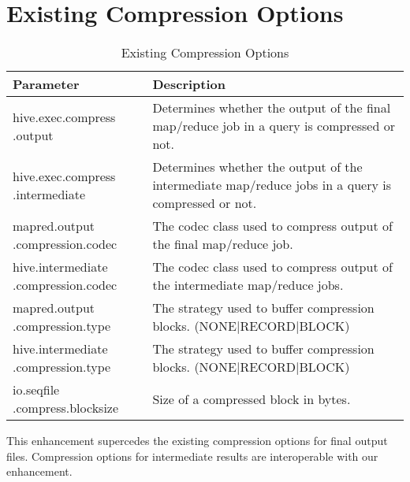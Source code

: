 \documentclass[11pt,a4paper]{article}
\begin{document}
\section{Existing Compression Options}
	\begin{table}[H]
		\begin{tabular}{| p{3.5cm} | p{7.5cm} |} \hline
			
			\textbf{Parameter} & \textbf{Description} \\ \hline
			hive.exec.compress\linebreak
			.output
			& Determines whether the output of the final map/reduce job in a query is compressed or not.
			\\ \hline
			
			hive.exec.compress\linebreak
			.intermediate
			& Determines whether the output of the intermediate map/reduce jobs in a query is compressed or not.
			\\ \hline
			
			mapred.output\linebreak
			.compression.codec
			& The codec class used to compress output of the final map/reduce job. 
			\\ \hline
			
			hive.intermediate\linebreak
			.compression.codec
			& The codec class used to compress output of the intermediate map/reduce jobs. 
			\\ \hline
			
			mapred.output\linebreak
			.compression.type
			& The strategy used to buffer compression blocks. (NONE|RECORD|BLOCK) 
			\\ \hline
			
			hive.intermediate\linebreak
			.compression.type
			& The strategy used to buffer compression blocks. (NONE|RECORD|BLOCK) 
			\\ \hline
			
			io.seqfile\linebreak
			.compress.blocksize
			& Size of a compressed block in bytes. 
			\\ \hline
			
		\end{tabular}
		\caption{Existing Compression Options}
	\end{table}
	
	This enhancement supercedes the existing compression options for final output files. Compression options for intermediate results are interoperable with our enhancement.
	
\end{document}
